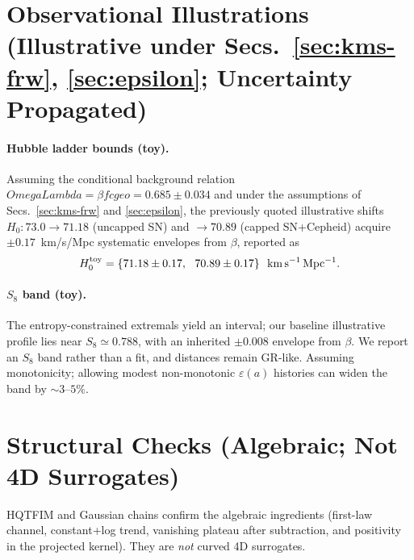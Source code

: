 \documentclass[aps,prd,onecolumn,superscriptaddress,nofootinbib]{revtex4-2}
\def\OmL{OmegaLambda}%
\def\cgeo{cgeo}%
\def\Omega_\Lambda{OmegaLambda}%
\providecommand{\OmL}{\Omega_\Lambda}
\providecommand{\cgeo}{c_{\rm geo}}
\providecommand{\be}{\begin{equation}}
\providecommand{\ee}{\end{equation}}
\begin{document}
\section{Observational Illustrations (Illustrative under Secs.~\ref{sec:kms-frw}, \ref{sec:epsilon}; Uncertainty Propagated)}
\label{sec:obs}

\paragraph{Hubble ladder bounds (toy).}
Assuming the conditional background relation \(\OmL=\beta f\cgeo=0.685\pm 0.034\) and under the assumptions of Secs.~\ref{sec:kms-frw} and \ref{sec:epsilon}, the previously quoted illustrative shifts \(H_0: 73.0\to 71.18\) (uncapped SN) and \(\to 70.89\) (capped SN+Cepheid) acquire \(\pm 0.17\)~km/s/Mpc systematic envelopes from \(\beta\), reported as
\be
H_0^{\rm toy}=\{71.18\pm 0.17,\ \ 70.89\pm 0.17\}\ \ \mathrm{km\,s^{-1}\,Mpc^{-1}}.
\ee

\paragraph{\(S_8\) band (toy).}
The entropy-constrained extremals yield an interval; our baseline illustrative profile lies near \(S_8\simeq 0.788\), with an inherited \(\pm 0.008\) envelope from \(\beta\). We report an \(S_8\) band rather than a fit, and distances remain GR-like. Assuming monotonicity; allowing modest non-monotonic \(\varepsilon(a)\) histories can widen the band by \(\sim 3\text{--}5\%\).

\section{Structural Checks (Algebraic; Not 4D Surrogates)}
\label{sec:substrates}
HQTFIM and Gaussian chains confirm the algebraic ingredients (first-law channel, constant+log trend, vanishing plateau after subtraction, and positivity in the projected kernel). They are \emph{not} curved 4D surrogates.

\end{document}
